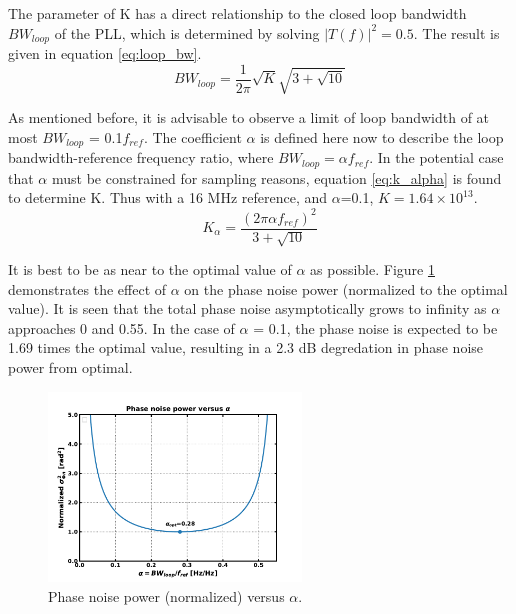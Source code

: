 			The parameter of K has a direct relationship to the closed loop bandwidth $BW_{loop}$ of the PLL, which is determined by solving $|T(f)|^2 = 0.5$. The result is given in equation \ref{eq:loop_bw}. 
			\begin{equation}\label{eq:loop_bw} 
				BW_{loop} = \frac{1}{2\pi}\sqrt{K}\sqrt{3+
				\sqrt{10}} 
			\end{equation} 

			As mentioned before, it is advisable to observe a limit of loop bandwidth of at most $BW_{loop}$ = 0.1$f_{ref}$. The coefficient $\alpha$ is defined here now to describe the loop bandwidth-reference frequency ratio, where $BW_{loop} = \alpha f_{ref}$. In the potential case that $\alpha$ must be constrained for sampling reasons, equation \ref{eq:k_alpha} is found to determine K. Thus with a 16 MHz reference, and $\alpha$=0.1, $K=1.64\times10^{13}$. 
			\begin{equation}\label{eq:k_alpha} 
				K_\alpha = \frac{(2\pi\alpha f_{ref})^2}{3 + \sqrt{10}} 
			\end{equation}

			It is best to be as near to the optimal value of $\alpha$ as possible. Figure \ref{fig:alpha_v_pn} demonstrates the effect of $\alpha$ on the phase noise power (normalized to the optimal value). It is seen that the total phase noise asymptotically grows to infinity as $\alpha$ approaches 0 and 0.55. In the case of $\alpha$ = 0.1, the phase noise is expected to be 1.69 times the optimal value, resulting in a 2.3 dB degredation in phase noise power from optimal.

			\begin{figure}[htb!]
				\center\includegraphics[width=0.6\textwidth, angle=0]{./figs/design/alpha_v_pn}
				\caption{Phase noise power (normalized) versus $\alpha$.}
				\label{fig:alpha_v_pn}
			\end{figure}

